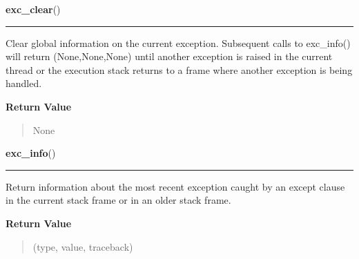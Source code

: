     \label{sys:exc_clear}

    \vspace{0.5ex}

\hspace{.8\funcindent}\begin{boxedminipage}{\funcwidth}

    \raggedright \textbf{exc\_clear}()

    \vspace{-1.5ex}

    \rule{\textwidth}{0.5\fboxrule}
\setlength{\parskip}{2ex}
    Clear global information on the current exception.  Subsequent calls to
    exc\_info() will return (None,None,None) until another exception is 
    raised in the current thread or the execution stack returns to a frame 
    where another exception is being handled.

\setlength{\parskip}{1ex}
      \textbf{Return Value}
    \vspace{-1ex}

      \begin{quote}
      None

      \end{quote}

    \end{boxedminipage}

    \label{sys:exc_info}

    \vspace{0.5ex}

\hspace{.8\funcindent}\begin{boxedminipage}{\funcwidth}

    \raggedright \textbf{exc\_info}()

    \vspace{-1.5ex}

    \rule{\textwidth}{0.5\fboxrule}
\setlength{\parskip}{2ex}
    Return information about the most recent exception caught by an except 
    clause in the current stack frame or in an older stack frame.

\setlength{\parskip}{1ex}
      \textbf{Return Value}
    \vspace{-1ex}

      \begin{quote}
      (type, value, traceback)

      \end{quote}

    \end{boxedminipage}

